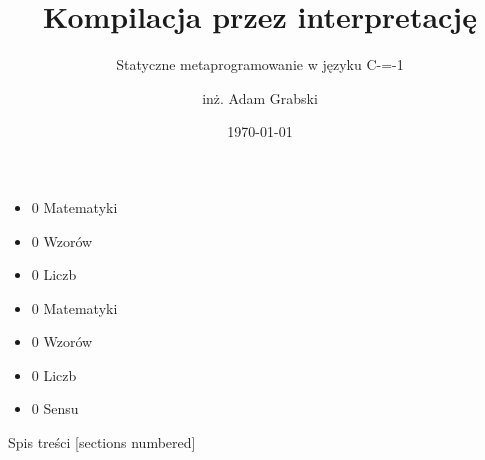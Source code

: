 \documentclass[10pt,xcolor=svgnames]{beamer} %
\title{Kompilacja przez interpretację}
\subtitle{Statyczne metaprogramowanie w języku C-=-1}
\author[name]{
	inż. Adam Grabski
}
\institute[uni]{ Wydział Elektroniki i Technik Informatycznych \\
Politechnika Warszawska}
\date{\today} %
\begin{document}
{
	
	\maketitle
}%

\begin{frame}
	\begin{itemize}
		\item 0 Matematyki
		\item 0 Wzorów
		\item 0 Liczb
	\end{itemize}

\end{frame}


\begin{frame}

	\begin{itemize}
		\item 0 Matematyki
		\item 0 Wzorów
		\item 0 Liczb
		\item 0 Sensu
	\end{itemize}

\end{frame}


\begin{frame}{Spis treści}
	[sections numbered] %
	\tableofcontents[subsectionstyle=hide/hide/hide] %
\end{frame}




\end{document}
